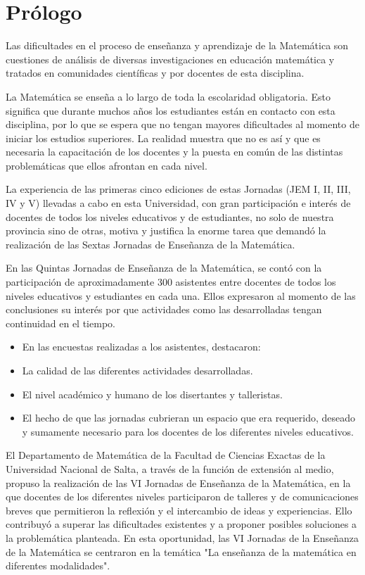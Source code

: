 \section*{\centering \sffamily Prólogo}

Las dificultades en el proceso de enseñanza y aprendizaje de la Matemática son cuestiones de análisis de diversas investigaciones en educación matemática y tratados en comunidades científicas y por docentes de esta disciplina. 

La Matemática se enseña a lo largo de toda la escolaridad obligatoria. Esto significa que durante muchos años los estudiantes están en contacto con esta disciplina, por lo que se espera que no tengan mayores dificultades al momento de iniciar los estudios superiores. La realidad muestra que no es así y que es necesaria la capacitación de los docentes y la puesta en común de las distintas problemáticas que ellos afrontan en cada nivel. 

La experiencia de las primeras cinco ediciones de estas Jornadas (JEM I, II, III, IV y V) llevadas a cabo en esta Universidad, con gran participación e interés de docentes de todos los niveles educativos y de estudiantes, no solo de nuestra provincia sino de otras, motiva y justifica la enorme tarea que demandó la realización de las Sextas Jornadas de Enseñanza de la Matemática. 

En las Quintas Jornadas de Enseñanza de la Matemática, se contó con la participación de aproximadamente 300 asistentes entre docentes de todos los niveles educativos y estudiantes en cada una. Ellos expresaron al momento de las conclusiones su interés por que actividades como las desarrolladas tengan continuidad en el tiempo.
\begin{itemize}
	\item En las encuestas realizadas a los asistentes, destacaron: 
	\item La calidad de las diferentes actividades desarrolladas. 
	\item El nivel académico y humano de los disertantes y talleristas. 
	\item El hecho de que las jornadas cubrieran un espacio que era requerido, deseado y sumamente necesario para los docentes de los diferentes niveles educativos. 
\end{itemize}

El Departamento de Matemática de la Facultad de Ciencias Exactas de la Universidad Nacional de Salta, a través de la función de extensión al medio, propuso la realización de las VI Jornadas de Enseñanza de la Matemática, en la que docentes de los diferentes niveles participaron de talleres y de comunicaciones breves que permitieron la reflexión y el intercambio de ideas y experiencias. Ello contribuyó a superar las dificultades existentes y a proponer posibles soluciones a la problemática planteada. En esta oportunidad, las VI Jornadas de la Enseñanza de la Matemática se centraron en la temática "La enseñanza de la matemática en diferentes modalidades". 
